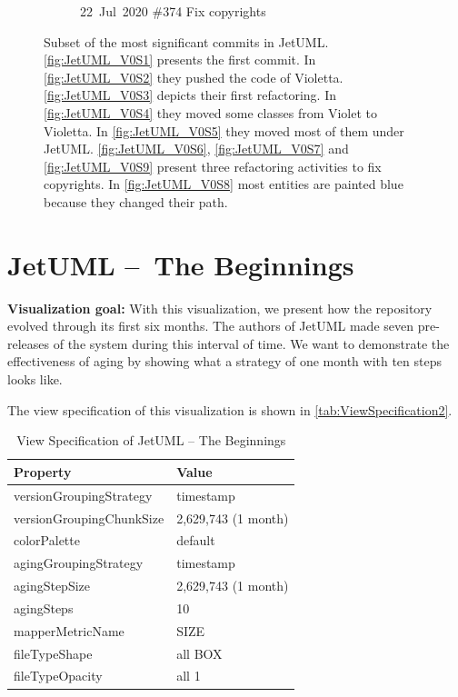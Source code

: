 \begin{figure}[ht]
\begin{subfigure}{0.32\textwidth}
        \caption{\mbox{22 Jul 2020}  \hfill  \linebreak  \#374 Fix copyrights} 
        \label{fig:JetUML_V0S9}
    \end{subfigure}
    \hspace*{\fill}
    \medskip
    \caption{
        Subset of the most significant commits in JetUML. \autoref{fig:JetUML_V0S1} presents the first commit. In \autoref{fig:JetUML_V0S2} they pushed the code of Violetta. \autoref{fig:JetUML_V0S3} depicts their first refactoring. In \autoref{fig:JetUML_V0S4} they moved some classes from Violet to Violetta. In \autoref{fig:JetUML_V0S5} they moved most of them under JetUML. \autoref{fig:JetUML_V0S6}, \autoref{fig:JetUML_V0S7} and \autoref{fig:JetUML_V0S9} present three refactoring activities to fix copyrights. In \autoref{fig:JetUML_V0S8} most entities are painted blue because they changed their path.} 
    \label{fig:JetUML_V0}
\end{figure}

\clearpage
\section{JetUML – The Beginnings}

\noindent
\textbf{Visualization goal:}
With this visualization, we present how the repository evolved through its first six months. 
The authors of JetUML made seven pre-releases of the system during this interval of time.
We want to demonstrate the effectiveness of aging by showing what a strategy of one month with ten steps looks like. 

The view specification of this visualization is shown in \autoref{tab:ViewSpecification2}.
\begin{table}[h]
	\small
    \centering
    \begin{tabular}{@{}ll@{}} 
        \toprule
        \textbf{Property} & \textbf{Value} \\\midrule
        versionGroupingStrategy & timestamp\\ 
		versionGroupingChunkSize & 2,629,743 (1 month)\\
		colorPalette & default\\
		agingGroupingStrategy & timestamp \\
		agingStepSize & 2,629,743 (1 month) \\
		agingSteps & 10 \\
		mapperMetricName & SIZE \\
		fileTypeShape & all BOX \\
		fileTypeOpacity & all 1 \\\bottomrule
    \end{tabular}
    \caption{View Specification of JetUML – The Beginnings}
    \label{tab:ViewSpecification2}
\end{table}


